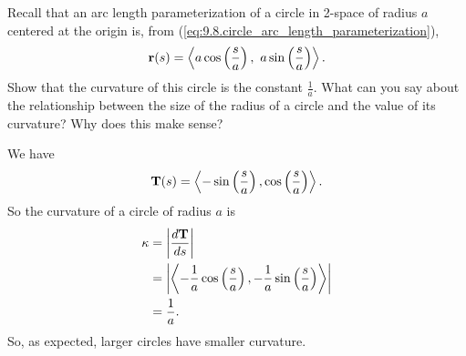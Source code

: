 \begin{activity} \label{A:9.8.5} Recall that an arc length
  parameterization of a circle in 2-space of radius $a$ centered at
  the origin is, from
  (\ref{eq:9.8.circle_arc_length_parameterization}),
  \[\mathbf{r}(s) = \left\langle a \cos\left(\frac{s}{a}\right),~
    a \sin\left(\frac{s}{a}\right)\right\rangle.\] 
    Show that the curvature
    of this circle is the constant $\frac{1}{a}$. What can you say about the relationship between the size of the radius of a circle and the value of its curvature?  Why does this make sense?

\end{activity}
\begin{smallhint}

\end{smallhint}
\begin{bighint}

\end{bighint}
\begin{activitySolution}
We have
\[\mathbf{T}(s) = \left\langle -\sin\left(\frac{s}{a}\right), \cos\left(\frac{s}{a}\right) \right\rangle.\]
So the curvature of a circle of radius $a$ is
\begin{align*}
\kappa &= \left\lvert \frac{d \mathbf{T}}{ds} \right\rvert \\
    &= \left\lvert \left\langle -\frac{1}{a}\cos\left(\frac{s}{a}\right), -\frac{1}{a}\sin\left(\frac{s}{a}\right) \right\rangle \right\rvert \\
    &= \frac{1}{a}.
\end{align*}
So, as expected, larger circles have smaller curvature.
\end{activitySolution}
\aftera
